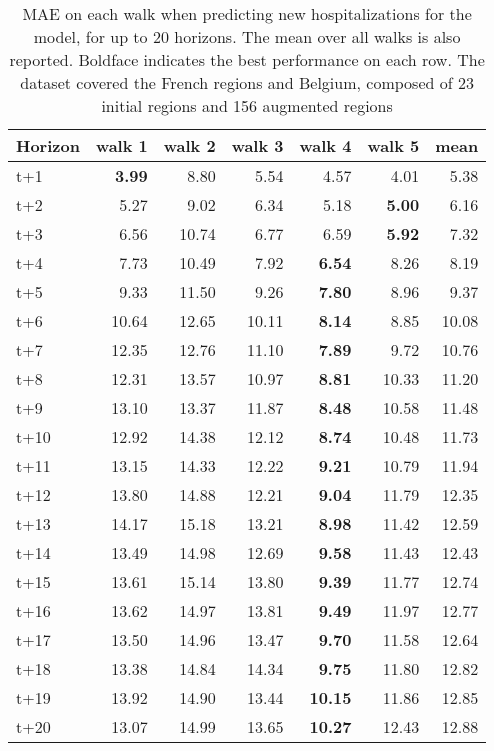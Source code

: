 \begin{table}[H]
\centering
\caption{MAE on each walk when predicting new hospitalizations for the model, for up to 20 horizons. The mean over all walks is also reported. Boldface indicates the best performance on each row. The dataset covered the French regions and Belgium, composed of 23 initial regions and 156 augmented regions }
\label{tab:MAE_walk_dense_model}
\begin{tabular}{lrrrrrr}
\toprule
Horizon &  walk 1 &  walk 2 &  walk 3 &  walk 4 &  walk 5 &  mean \\
\midrule
t+1  & \textbf{3.99}  & 8.80  & 5.54  & 4.57  & 4.01  & 5.38  \\
t+2  & 5.27  & 9.02  & 6.34  & 5.18  & \textbf{5.00}  & 6.16  \\
t+3  & 6.56  & 10.74  & 6.77  & 6.59  & \textbf{5.92}  & 7.32  \\
t+4  & 7.73  & 10.49  & 7.92  & \textbf{6.54}  & 8.26  & 8.19  \\
t+5  & 9.33  & 11.50  & 9.26  & \textbf{7.80}  & 8.96  & 9.37  \\
t+6  & 10.64  & 12.65  & 10.11  & \textbf{8.14}  & 8.85  & 10.08  \\
t+7  & 12.35  & 12.76  & 11.10  & \textbf{7.89}  & 9.72  & 10.76  \\
t+8  & 12.31  & 13.57  & 10.97  & \textbf{8.81}  & 10.33  & 11.20  \\
t+9  & 13.10  & 13.37  & 11.87  & \textbf{8.48}  & 10.58  & 11.48  \\
t+10  & 12.92  & 14.38  & 12.12  & \textbf{8.74}  & 10.48  & 11.73  \\
t+11  & 13.15  & 14.33  & 12.22  & \textbf{9.21}  & 10.79  & 11.94  \\
t+12  & 13.80  & 14.88  & 12.21  & \textbf{9.04}  & 11.79  & 12.35  \\
t+13  & 14.17  & 15.18  & 13.21  & \textbf{8.98}  & 11.42  & 12.59  \\
t+14  & 13.49  & 14.98  & 12.69  & \textbf{9.58}  & 11.43  & 12.43  \\
t+15  & 13.61  & 15.14  & 13.80  & \textbf{9.39}  & 11.77  & 12.74  \\
t+16  & 13.62  & 14.97  & 13.81  & \textbf{9.49}  & 11.97  & 12.77  \\
t+17  & 13.50  & 14.96  & 13.47  & \textbf{9.70}  & 11.58  & 12.64  \\
t+18  & 13.38  & 14.84  & 14.34  & \textbf{9.75}  & 11.80  & 12.82  \\
t+19  & 13.92  & 14.90  & 13.44  & \textbf{10.15}  & 11.86  & 12.85  \\
t+20  & 13.07  & 14.99  & 13.65  & \textbf{10.27}  & 12.43  & 12.88  \\

\bottomrule
\end{tabular}
\end{table}
